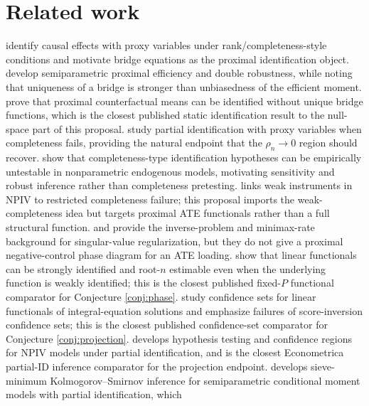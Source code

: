 \documentclass[11pt]{article}
\theoremstyle{definition}
\theoremstyle{plain}
\theoremstyle{remark}
\begin{document}
\section{Related work}
\cite{MiaoGengTchetgen2018} identify causal effects with proxy variables under
rank/completeness-style conditions and motivate bridge equations as the
proximal identification object.  \cite{CuiPuShiMiaoTchetgen2024} develop
semiparametric proximal efficiency and double robustness, while noting that
uniqueness of a bridge is stronger than unbiasedness of the efficient moment.
\cite{ZhangLiMiaoTchetgen2023} prove that proximal counterfactual means can be
identified without unique bridge functions, which is the closest published
static identification result to the null-space part of this proposal.
\cite{GhassamiShpitserTchetgen2023} study partial identification with proxy
variables when completeness fails, providing the natural endpoint that the
$\rho_n\to0$ region should recover.  \cite{CanaySantosShaikh2013} show that
completeness-type identification hypotheses can be empirically untestable in
nonparametric endogenous models, motivating sensitivity and robust inference
rather than completeness pretesting.  \cite{Freyberger2015} links weak
instruments in NPIV to restricted completeness failure; this proposal imports
the weak-completeness idea but targets proximal ATE functionals rather than a
full structural function.  \cite{CarrascoFlorensRenault2007} and
\cite{ChenReiss2011} provide the inverse-problem and minimax-rate background
for singular-value regularization, but they do not give a proximal
negative-control phase diagram for an ATE loading.
\cite[Abstract and Section 2]{BennettKallusMaoNeweySyrgkanisUehara2023} show
that linear functionals can be strongly identified and root-$n$ estimable even
when the underlying function is weakly identified; this is the closest
published fixed-$P$ functional comparator for Conjecture
\ref{conj:phase}.  \cite[Sections 2--3]{SmuclerRobinsRotnitzky2025} study
confidence sets for linear functionals of integral-equation solutions and
emphasize failures of score-inversion confidence sets; this is the closest
published confidence-set comparator for Conjecture \ref{conj:projection}.
\cite[Sections 2--3]{Santos2012} develops hypothesis testing and confidence
regions for NPIV models under partial identification, and is the closest
Econometrica partial-ID inference comparator for the projection endpoint.
\cite[Section 2]{Hong2017} develops sieve-minimum Kolmogorov--Smirnov inference
for semiparametric conditional moment models with partial identification, which
\end{document}
